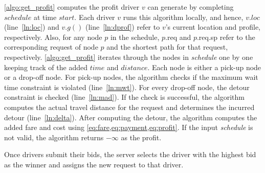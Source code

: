 \cref{algo:get_profit} computes the profit driver $v$ can generate by completing $schedule$ at time $start$. Each driver $v$ runs this algorithm locally, and hence, $v.loc$ (line~\ref{ln:loc}) and $v.g()$ (line~\ref{ln:dprof}) refer to $v$'s current location and profile, respectively. Also, for any node $p$ in the schedule, $p$.req and $p$.req.sp refer to the corresponding request of node $p$ and the shortest path for that request, respectively. \cref{algo:get_profit} iterates through the nodes in \textit{schedule} one by one keeping track of the added $time$ and $distance$. Each node is either a pick-up node or a drop-off node. For pick-up nodes, the algorithm checks if the maximum wait time constraint is violated (line~\ref{ln:mwt}). For every drop-off node, the detour constraint is checked (line~\ref{ln:mad}). If the check is successful, the algorithm computes the actual travel distance for the request and determines the incurred detour (line~\ref{ln:delta}). After computing the detour, the algorithm computes the added fare and cost using \cref{eq:fare,eq:payment,eq:profit}. If the input \textit{schedule} is not valid, the algorithm returns $-\infty$ as the profit.

Once drivers submit their bids, the server selects the driver with the highest bid as the winner and assigns the new request to that driver.





